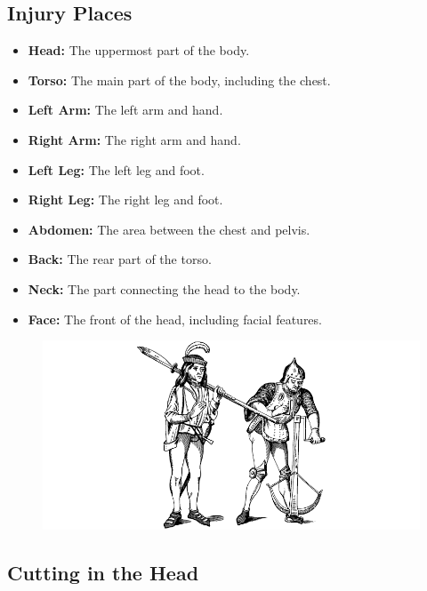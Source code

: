 \documentclass[12pt]{book}
\begin{document}
\subsection{Injury Places}

\begin{itemize}
    \item \textbf{Head:} The uppermost part of the body.
    \item \textbf{Torso:} The main part of the body, including the chest.
    \item \textbf{Left Arm:} The left arm and hand.
    \item \textbf{Right Arm:} The right arm and hand.
    \item \textbf{Left Leg:} The left leg and foot.
    \item \textbf{Right Leg:} The right leg and foot.
    \item \textbf{Abdomen:} The area between the chest and pelvis.
    \item \textbf{Back:} The rear part of the torso.
    \item \textbf{Neck:} The part connecting the head to the body.
    \item \textbf{Face:} The front of the head, including facial features.
\end{itemize}

\begin{figure}[h]
    \centering
    \includegraphics[width=\textwidth]{./images/combat03.pdf}
\end{figure}

\subsection{Cutting in the Head}
\end{document}
